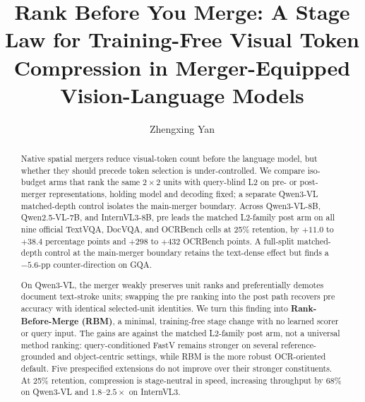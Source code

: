 \documentclass[sigconf,nonacm]{acmart}
\title[Rank Before You Merge]{Rank Before You Merge: A Stage Law for Training-Free Visual Token
  Compression in Merger-Equipped Vision-Language Models}
\author{Zhengxing Yan}
\begin{document}
\begin{abstract}
Native spatial mergers reduce visual-token count before the language model, but
whether they should precede token selection is under-controlled. We compare
iso-budget arms that rank the same $2\!\times\!2$ units with query-blind L2 on
pre- or post-merger representations, holding model and decoding fixed; a
separate Qwen3-VL matched-depth control isolates the main-merger boundary.
Across Qwen3-VL-8B, Qwen2.5-VL-7B, and InternVL3-8B, pre leads the
matched L2-family post arm on all nine official TextVQA, DocVQA, and OCRBench cells at
25\% retention, by $+11.0$ to $+38.4$ percentage points and $+298$ to $+432$
OCRBench points. A full-split matched-depth control at the main-merger boundary
retains the text-dense effect but finds a $-5.6$-pp counter-direction on GQA.

On Qwen3-VL, the merger weakly preserves unit ranks and preferentially demotes
document text-stroke units; swapping the pre ranking into the post path recovers
pre accuracy with identical selected-unit identities. We turn this finding into
\textbf{Rank-Before-Merge (RBM)}, a minimal, training-free stage change with no
learned scorer or query input. The gains are against the matched L2-family post arm,
not a universal method ranking: query-conditioned FastV remains stronger on
several reference-grounded and object-centric settings, while RBM is the more
robust OCR-oriented default. Five prespecified extensions do not improve over
their stronger constituents. At 25\% retention, compression is stage-neutral in
speed, increasing throughput by $68\%$ on Qwen3-VL and
$1.8$--$2.5\times$ on InternVL3.
\end{abstract}

\maketitle
\end{document}
